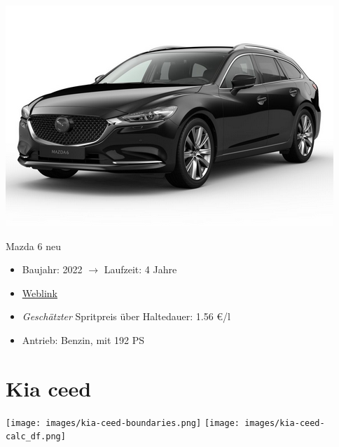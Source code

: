 \documentclass[landscape, DIV=99, 14pt]{scrartcl}
\begin{document}
\pagebreak
\null
\vspace{2cm}
\begin{center}
\includegraphics[width=0.9\columnwidth]{cars/mazda-6-neu.png}

Mazda 6 neu
\end{center}

\begin{itemize}
    \item Baujahr: 2022 $\rightarrow$ Laufzeit: 4 Jahre
    \item \href{https://konfigurator.meinauto.de/mazda/neuwagen/48-6/angebote/6-kombi/konfigurator/\#!/extras/exclusive-line/8846370/10,11/private/65352-5416-204698/984/61c9aa657e74c/cash-purchase/32545--287374/48,0,10000,0,0,0,0,0,}{Weblink}
    \item \emph{Gesch\"atzter} Spritpreis \"uber Haltedauer: 1.56 \euro{}/l
    \item Antrieb: Benzin, mit 192 PS
\end{itemize}

\pagebreak


\twocolumn

\section*{Kia ceed}
\begin{center}
\texttt{[image: images/kia-ceed-boundaries.png]}
\null
\vspace{0.5cm}
\texttt{[image: images/kia-ceed-calc\_df.png]}
\end{center}
\end{document}
